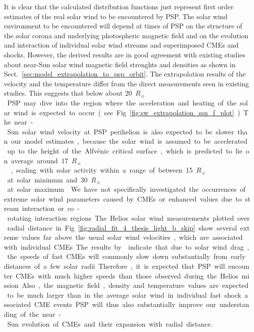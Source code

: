 \documentclass[]{aa}
\newcommand{\Rs}{$R_\sun{}$}
\begin{document}
	It is clear that the calculated distribution functions just represent first order estimates of the real solar wind to be encountered by PSP. The solar wind environment to be encountered will depend at times of PSP on the structure of the solar corona and underlying photospheric magnetic field and on the evolution and interaction of individual solar wind streams and superimposed CMEs and shocks. However, the derived results are in good agreement with existing studies about near-Sun solar wind magnetic field strenghts and densities as shown in Sect.~\ref{sec:model_extrapolation_to_psp_orbit}. The extrapolation results of the velocity and the temperature differ from the direct measurements seen in existing studies. This suggests that below about \SI{20}{\Rs} PSP may dive into the region where the acceleration and heating of the solar wind is expected to occur (see Fig.~\ref{fig:sw_extrapolation_ssn_f_plot}). The near-Sun solar wind velocity at PSP perihelion is also expected to be slower than our model estimates, because the solar wind is assumed to be accelerated up to the height of the Alfvénic critical surface, which is predicted to lie on average around \SI{17}{\Rs} \citep[e.g.,][]{Sittler1999,Exarhos2000}, scaling with solar activity within a range of between \SI{15}{\Rs} at solar minimum and \SI{30}{\Rs} at solar maximum \citep{Katsikas2010,Goelzer2014}.

	We have not specifically investigated the occurrences of extreme solar wind parameters caused by CMEs or enhanced values due to stream interaction or co-rotating interaction regions. The Helios solar wind measurements plotted over radial distance in Fig.~\ref{fig:radial_fit_4_thesis_light_b_skip} show several extreme values far above the usual solar wind velocities, which are associated with individual CMEs. The results by \citet{Sachdeva2017} indicate that due to solar wind drag, the speeds of fast CMEs will commonly slow down substantially from early distances of a few solar radii. Therefore, it is expected that PSP will encounter CMEs with much higher speeds than those observed during the Helios mission. Also, the magnetic field, density and temperature values are expected to be much larger than in the average solar wind in individual fast shock associated CME events. PSP will thus also substantially improve our understanding of the near-Sun evolution of CMEs and their expansion with radial distance.
\end{document}
